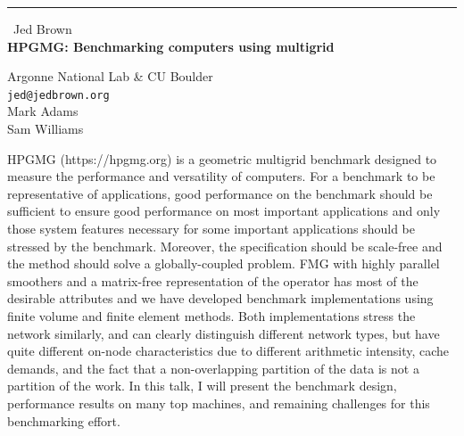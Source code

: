\documentclass{report}
\begin{document}
\begin{center}
\rule{6in}{1pt} \
{\large Jed Brown \\
{\bf HPGMG: Benchmarking computers using multigrid}}

Argonne National Lab \& CU Boulder
\\
{\tt jed@jedbrown.org}\\
Mark Adams\\
Sam Williams\end{center}

HPGMG (https://hpgmg.org) is a geometric multigrid benchmark designed to
measure the performance and versatility of computers. For a benchmark to
be representative of applications, good performance on the benchmark
should be sufficient to ensure good performance on most important
applications and only those system features necessary for some important
applications should be stressed by the benchmark. Moreover, the
specification should be scale-free and the method should solve a
globally-coupled problem. FMG with highly parallel smoothers and a
matrix-free representation of the operator has most of the desirable
attributes and we have developed benchmark implementations using finite
volume and finite element methods. Both implementations stress the
network similarly, and can clearly distinguish different network types,
but have quite different on-node characteristics due to different
arithmetic intensity, cache demands, and the fact that a non-overlapping
partition of the data is not a partition of the work. In this talk, I
will present the benchmark design, performance results on many top
machines, and remaining challenges for this benchmarking effort.
\end{document}
